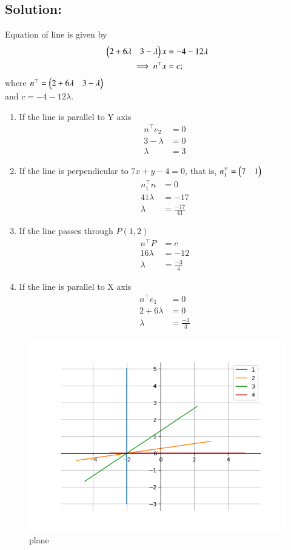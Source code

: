 \documentclass[journal]{IEEEtran}
\begin{document}
\subsection*{\textbf{Solution:}} 
Equation of line is given by
\begin{align}
    \begin{pmatrix}2+6\lambda &3-\lambda\end{pmatrix} x &=-4-12\lambda\\
    \implies n^\top x &= c;
\end{align}
where $n^\top = \begin{pmatrix}2+6\lambda &3-\lambda\end{pmatrix}$\\
and $c=-4-12\lambda$. \\
\begin{enumerate}

\item If the line is parallel to Y axis
\begin{align}
n^\top e_2 &=0 \\
3 -\lambda &= 0 \\
\lambda &= 3
\end{align}




\item If the line is perpendicular to $7x+y-4=0$, that is, $n_1^\top =\begin{pmatrix}7&1\end{pmatrix}$
\begin{align}
    n_1^\top n &= 0 \\
    41\lambda &= -17 \\
    \lambda &= \frac{-17}{41}
\end{align}

\item If the line passes through $P(1,2)$
\begin{align}
  n^\top P &= c \\
  16\lambda &= -12 \\
  \lambda &= \frac{-3}{4}
\end{align}

\item If the line is parallel to X axis
\begin{align}
n^\top e_1 &=0 \\
2+6\lambda &= 0 \\
\lambda &= \frac{-1}{3}
\end{align}
\end{enumerate}

\begin{figure}[H]
\centering
\includegraphics[width=0.7\columnwidth]{figs/fig.png} 
\caption{plane}
\label{}
\end{figure}
\end{document}
